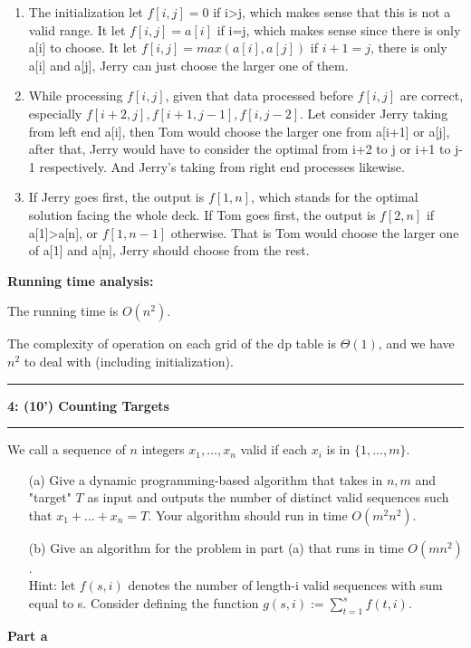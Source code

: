 \documentclass{article}
\newcommand\question[2]{\vspace{.25in}\hrule\textbf{#1: #2}\vspace{.5em}\hrule\vspace{.10in}}
\begin{document}
\begin{enumerate}
	\item The initialization let $f[i,j]=0$ if i>j, which makes sense that this is not a valid range. It let $f[i,j]=a[i]$ if i=j, which makes sense since there is only a[i] to choose. It let $f[i,j]=max(a[i],a[j])$ if $i+1=j$, there is only a[i] and a[j], Jerry can just choose the larger one of them.
	\item While processing $f[i,j]$, given that data processed before $f[i,j]$ are correct, especially $f[i+2,j],f[i+1,j-1],f[i,j-2]$. Let consider Jerry taking from left end a[i], then Tom would choose the larger one from a[i+1] or a[j], after that, Jerry would have to consider the optimal from i+2 to j or i+1 to j-1 respectively. And Jerry's taking from right end processes likewise.
	\item If Jerry goes first, the output is $f[1,n]$, which stands for the optimal solution facing the whole deck. If Tom goes first, the output is $f[2,n]$ if a[1]>a[n], or $f[1,n-1]$ otherwise. That is Tom would choose the larger one of a[1] and a[n], Jerry should choose from the rest.
\end{enumerate}

\textbf{Running time analysis:}

The running time is $O(n^2)$.

The complexity of operation on each grid of the dp table is $\Theta(1)$, and we have $n^2$ to deal with (including initialization).





\pagebreak

\question{4}{(10') Counting Targets}
We call a sequence of $n$ integers $x_1, ... ,x_n$ valid if each $x_i$ is in $\{1, ..., m\}$.
\begin{enumerate}
	\item[(a)] Give a dynamic programming-based algorithm that takes in $n, m$ and "target" $T$ as input
		and outputs the number of distinct valid sequences such that $x_1 + ... + x_n = T$. Your
		algorithm should run in time $O(m^2n^2)$.
	\item[(b)] Give an algorithm for the problem in part (a) that runs in time $O(mn^2)$.
		\\
		Hint: let $f(s, i)$ denotes the number of length-i valid sequences with sum equal to s.
		Consider defining the function $g(s, i) :=\sum^s_{t=1} f(t, i).$
\end{enumerate}

\textbf{Part a}
\end{document}
